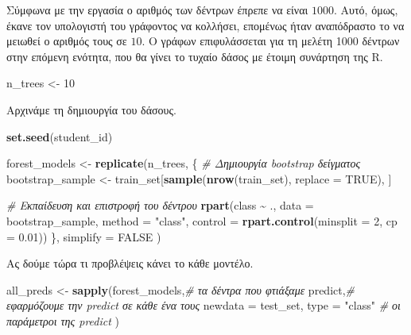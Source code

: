 \documentclass[
]{article}
\newenvironment{Shaded}{\begin{snugshade}}{\end{snugshade}}
\newcommand{\AttributeTok}[1]{\textcolor[rgb]{0.13,0.29,0.53}{#1}}
\newcommand{\CommentTok}[1]{\textcolor[rgb]{0.56,0.35,0.01}{\textit{#1}}}
\newcommand{\ConstantTok}[1]{\textcolor[rgb]{0.56,0.35,0.01}{#1}}
\newcommand{\DecValTok}[1]{\textcolor[rgb]{0.00,0.00,0.81}{#1}}
\newcommand{\FloatTok}[1]{\textcolor[rgb]{0.00,0.00,0.81}{#1}}
\newcommand{\FunctionTok}[1]{\textcolor[rgb]{0.13,0.29,0.53}{\textbf{#1}}}
\newcommand{\NormalTok}[1]{#1}
\newcommand{\OtherTok}[1]{\textcolor[rgb]{0.56,0.35,0.01}{#1}}
\newcommand{\SpecialCharTok}[1]{\textcolor[rgb]{0.81,0.36,0.00}{\textbf{#1}}}
\newcommand{\StringTok}[1]{\textcolor[rgb]{0.31,0.60,0.02}{#1}}
\begin{document}
Σύμφωνα με την εργασία ο αριθμός των δέντρων έπρεπε να είναι \(1000\).
Αυτό, όμως, έκανε τον υπολογιστή του γράφοντος να κολλήσει, επομένως
ήταν αναπόδραστο το να μειωθεί ο αριθμός τους σε \(10\). Ο γράφων
επιφυλάσσεται για τη μελέτη 1000 δέντρων στην επόμενη ενότητα, που θα
γίνει το τυχαίο δάσος με έτοιμη συνάρτηση της R.

\begin{Shaded}
\begin{Highlighting}[]
\NormalTok{n\_trees }\OtherTok{\textless{}{-}} \DecValTok{10}
\end{Highlighting}
\end{Shaded}

Αρχινάμε τη δημιουργία του δάσους.

\begin{Shaded}
\begin{Highlighting}[]
\FunctionTok{set.seed}\NormalTok{(student\_id)}

\NormalTok{forest\_models }\OtherTok{\textless{}{-}} \FunctionTok{replicate}\NormalTok{(n\_trees, \{}
  \CommentTok{\# Δημιουργία bootstrap δείγματος}
\NormalTok{  bootstrap\_sample }\OtherTok{\textless{}{-}}\NormalTok{ train\_set[}\FunctionTok{sample}\NormalTok{(}\FunctionTok{nrow}\NormalTok{(train\_set), }\AttributeTok{replace =} \ConstantTok{TRUE}\NormalTok{), ]}
  
  \CommentTok{\# Εκπαίδευση και επιστροφή του δέντρου}
  \FunctionTok{rpart}\NormalTok{(class }\SpecialCharTok{\textasciitilde{}}\NormalTok{ ., }\AttributeTok{data =}\NormalTok{ bootstrap\_sample, }\AttributeTok{method =} \StringTok{"class"}\NormalTok{, }
        \AttributeTok{control =} \FunctionTok{rpart.control}\NormalTok{(}\AttributeTok{minsplit =} \DecValTok{2}\NormalTok{, }\AttributeTok{cp =} \FloatTok{0.01}\NormalTok{))}
\NormalTok{\}, }
\AttributeTok{simplify =} \ConstantTok{FALSE}
\NormalTok{)}
\end{Highlighting}
\end{Shaded}

Ας δούμε τώρα τι προβλέψεις κάνει το κάθε μοντέλο.

\begin{Shaded}
\begin{Highlighting}[]
\NormalTok{all\_preds }\OtherTok{\textless{}{-}} \FunctionTok{sapply}\NormalTok{(forest\_models,}\CommentTok{\# τα δέντρα που φτιάξαμε}
\NormalTok{                    predict,}\CommentTok{\# εφαρμόζουμε την predict σε κάθε ένα τους}
                    \AttributeTok{newdata =}\NormalTok{ test\_set, }\AttributeTok{type =} \StringTok{"class"} \CommentTok{\# οι παράμετροι της predict}
\NormalTok{                    )}
\end{Highlighting}
\end{Shaded}
\end{document}
